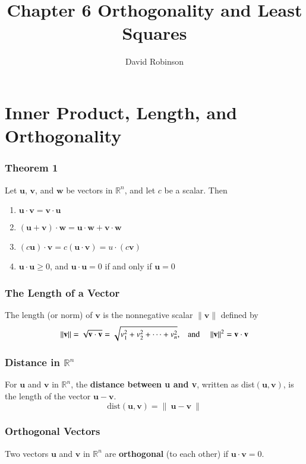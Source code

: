 \documentclass{article}
\title{Chapter 6 Orthogonality and Least Squares}
\author{David Robinson}
\date{}
\begin{document}
\maketitle

\section*{Inner Product, Length, and Orthogonality}

\subsubsection*{Theorem 1}
Let $\mathbf{u}$, $\mathbf{v}$, and $\mathbf{w}$ be vectors in $\mathbb{R}^n$, and let $c$ be a
scalar. Then
\begin{enumerate}
    \item $\mathbf{u}\cdot\mathbf{v}=\mathbf{v}\cdot\mathbf{u}$
    \item $(\mathbf{u}+\mathbf{v})\cdot\mathbf{w}=\mathbf{u}\cdot\mathbf{w}+\mathbf{v}\cdot
    \mathbf{w}$
    \item $(c\mathbf{u})\cdot\mathbf{v}=c(\mathbf{u}\cdot\mathbf{v})=u\cdot(c\mathbf{v})$
    \item $\mathbf{u}\cdot\mathbf{u}\geq 0$, and $\mathbf{u}\cdot\mathbf{u}=0$ if and only if
    $\mathbf{u}=0$
\end{enumerate}

\subsubsection*{The Length of a Vector}
The length (or norm) of $\mathbf{v}$ is the nonnegative scalar $\|\mathbf{v}\|$ defined by
\[\|\mathbf{v}\|=\sqrt{\mathbf{v}\cdot\mathbf{v}}=\sqrt{v_1^2+v_2^2+\cdots+v_n^2}\text{,\quad and
\quad}\|\mathbf{v}\|^2=\mathbf{v}\cdot\mathbf{v}\]

\subsubsection*{Distance in $\mathbb{R}^n$}
For $\mathbf{u}$ and $\mathbf{v}$ in $\mathbb{R}^n$, the \textbf{distance between u and v}, written
as dist$(\mathbf{u}, \mathbf{v})$, is the length of the vector $\mathbf{u}-\mathbf{v}$.
\[\text{dist}(\mathbf{u}, \mathbf{v})=\|\:\mathbf{u}-\mathbf{v}\:\|\]

\subsubsection*{Orthogonal Vectors}
Two vectors $\mathbf{u}$ and $\mathbf{v}$ in $\mathbb{R}^n$ are \textbf{orthogonal} (to each other)
if $\mathbf{u}\cdot\mathbf{v}=0$.
\end{document}
